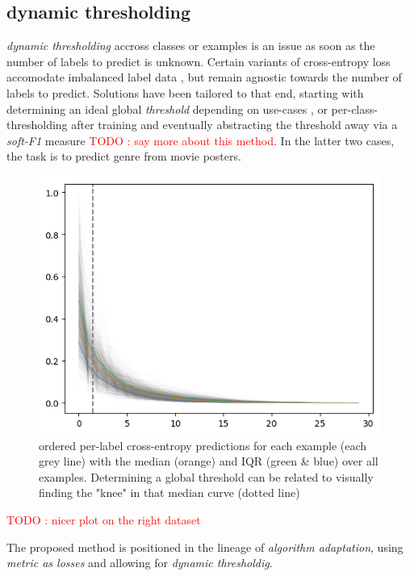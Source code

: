 \documentclass[sigconf,natbib,screen=true,review=true,anonymous]{acmart}
\newcommand\todo[1]{\textcolor{red}{TODO : #1}}
\begin{document}
\subsection{dynamic thresholding}
\label{sec:org4d5565b}

\emph{dynamic thresholding} accross classes or examples is an issue as soon as the number of labels to predict is unknown. Certain variants of cross-entropy loss accomodate imbalanced label data  \cite{focalLoss}, but remain agnostic towards the number of labels to predict. Solutions have been tailored to that end, starting with determining an ideal global \emph{threshold} depending on use-cases \cite{threshForF1}, or per-class-thresholding after training \cite{moviePosters} and eventually abstracting the threshold away via a \emph{soft-F1} measure \cite{softF1} \todo{say more about this method}. In the latter two cases, the task is to predict genre from movie posters.

\begin{figure}[htbp]
\centering
\includegraphics[width=.9\linewidth]{./images/knee.png}
\caption{\label{fig:knee}
ordered per-label cross-entropy predictions for each example (each grey line) with the median (orange) and IQR (green \& blue) over all examples. Determining a global threshold can be related to visually finding the "knee" in that median curve (dotted line)}
\end{figure}

\todo{nicer plot on the right dataset}

The proposed method is positioned in the lineage of \emph{algorithm adaptation}, using \emph{metric as losses} and allowing for \emph{dynamic thresholdig}. 
\end{document}
